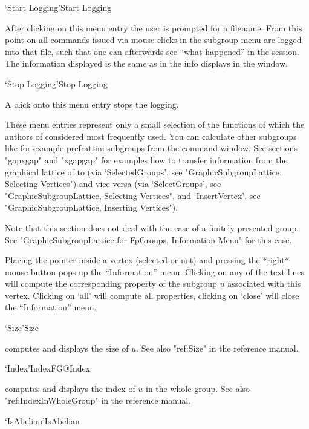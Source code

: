 \>`Start Logging'{Start Logging}

After clicking on this menu entry the user is prompted for a filename. From 
this point on all commands issued via mouse clicks in the subgroup menu are 
logged into that file, such that one can afterwards see ``what happened''
in the {\XGAP} session. The information displayed is the same as in the
info displays in the {\GAP} window. 

\>`Stop Logging'{Stop Logging}

A click onto this menu entry stops the {\XGAP} logging.

\bigskip

These menu entries represent only a small selection of the functions
of {\GAP} which the authors of {\XGAP} considered most frequently
used. You can calculate other subgroups like for example prefrattini
subgroups from the {\GAP} command window. See sections "gapxgap" and
"xgapgap" for examples how to transfer information from the graphical
lattice of {\XGAP} to {\GAP} (via `SelectedGroups', see
"GraphicSubgroupLattice, Selecting Vertices") and vice versa (via
`SelectGroups', see "GraphicSubgroupLattice, Selecting Vertices", and
`InsertVertex', see "GraphicSubgroupLattice, Inserting Vertices").



Note that this section does not deal with the case of a finitely presented
group. See "GraphicSubgroupLattice for FpGroups, Information Menu" for this 
case.

Placing the pointer  inside a vertex (selected  or not)  and pressing the
*right* mouse button pops up the  ``Information'' menu.  Clicking on any of
the text  lines will compute  the corresponding  property of the subgroup
$u$ associated  with  this vertex.  Clicking   on `all' will  compute all
properties, clicking on `close' will close the ``Information'' menu.

\>`Size'{Size}

computes and displays the size of $u$.  See also "ref:Size" in the
{\GAP} reference manual.

\>`Index'{IndexFG}@{Index}

computes and displays the  index  of $u$ in   the whole group.  See  also
"ref:IndexInWholeGroup" in the {\GAP} reference manual.

\>`IsAbelian'{IsAbelian}

